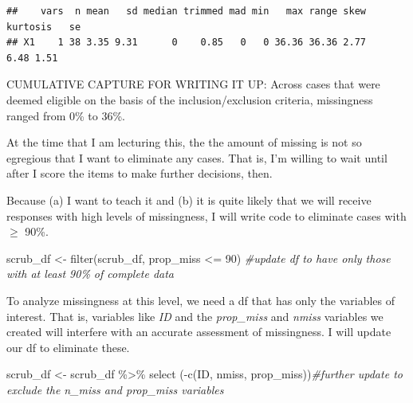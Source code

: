 \documentclass[
  english,
]{book}
\newenvironment{Shaded}{\begin{snugshade}}{\end{snugshade}}
\newcommand{\CommentTok}[1]{\textcolor[rgb]{0.56,0.35,0.01}{\textit{#1}}}
\newcommand{\DecValTok}[1]{\textcolor[rgb]{0.00,0.00,0.81}{#1}}
\newcommand{\FunctionTok}[1]{\textcolor[rgb]{0.00,0.00,0.00}{#1}}
\newcommand{\NormalTok}[1]{#1}
\newcommand{\OtherTok}[1]{\textcolor[rgb]{0.56,0.35,0.01}{#1}}
\newcommand{\SpecialCharTok}[1]{\textcolor[rgb]{0.00,0.00,0.00}{#1}}
\begin{document}
\begin{verbatim}
##    vars  n mean   sd median trimmed mad min   max range skew kurtosis   se
## X1    1 38 3.35 9.31      0    0.85   0   0 36.36 36.36 2.77     6.48 1.51
\end{verbatim}

\begin{Shaded}
\end{Shaded}

CUMULATIVE CAPTURE FOR WRITING IT UP: Across cases that were deemed eligible on the basis of the inclusion/exclusion criteria, missingness ranged from 0\% to 36\%.

At the time that I am lecturing this, the the amount of missing is not so egregious that I want to eliminate any cases. That is, I'm willing to wait until after I score the items to make further decisions, then.

Because (a) I want to teach it and (b) it is quite likely that we will receive responses with high levels of missingness, I will write code to eliminate cases with \(\geq\) 90\%.

\begin{Shaded}
\begin{Highlighting}[]
\NormalTok{scrub\_df }\OtherTok{\textless{}{-}} \FunctionTok{filter}\NormalTok{(scrub\_df, prop\_miss }\SpecialCharTok{\textless{}=} \DecValTok{90}\NormalTok{)  }\CommentTok{\#update df to have only those with at least 90\% of complete data}
\end{Highlighting}
\end{Shaded}

To analyze missingness at this level, we need a df that has only the variables of interest. That is, variables like \emph{ID} and the \emph{prop\_miss} and \emph{nmiss} variables we created will interfere with an accurate assessment of missingness. I will update our df to eliminate these.

\begin{Shaded}
\begin{Highlighting}[]
\NormalTok{scrub\_df }\OtherTok{\textless{}{-}}\NormalTok{ scrub\_df }\SpecialCharTok{\%\textgreater{}\%}
  \FunctionTok{select}\NormalTok{ (}\SpecialCharTok{{-}}\FunctionTok{c}\NormalTok{(ID, nmiss, prop\_miss))}\CommentTok{\#further update to exclude the n\_miss and prop\_miss variables}
\end{Highlighting}
\end{Shaded}
\end{document}
